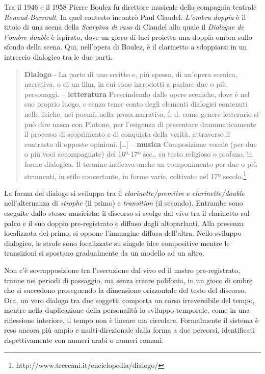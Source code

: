 Tra il 1946 e il 1958 Pierre Boulez fu direttore musicale della compagnia teatrale \emph{Renaud-Barrault}. In quel contesto incontrò Paul Claudel. \emph{L’ombra doppia} è il titolo di una scena della \emph{Scarpina di raso} di Claudel alla quale il \emph{Dialogue de l'ombre double} è ispirato, dove un gioco di luci proietta una doppia ombra sullo sfondo della scena. Qui, nell'opera di Boulez, è il clarinetto a sdoppiarsi in un intreccio dialogico tra le due parti.

\begin{quote}
{\small
\textbf{Dialogo} - La parte di uno scritto e, più spesso, di un’opera scenica, narrativa, o di un film, in cui sono introdotti a parlare due o più personaggi. -- \textbf{letteratura} Prescindendo dalle opere sceniche, dove è nel suo proprio luogo, e senza tener conto degli elementi dialogici contenuti nelle liriche, nei poemi, nella prosa narrativa, il d. come genere letterario si può dire nasca con Platone, per l’esigenza di presentare drammaticamente il processo di scoprimento e di conquista della verità, attraverso il contrasto di opposte opinioni. [\ldots] -- \textbf{musica} Composizione vocale (per due o più voci accompagnate) del 16º-17º sec., su testo religioso o profano, in forme dialogica. Il termine indicava anche un componimento per due o più strumenti, in stile concertante, in forme varie, coltivato nel 17º secolo.\footnote{http://www.treccani.it/enciclopedia/dialogo/}}
\end{quote}

La forma del dialogo si sviluppa tra il \emph{clarinette/première} e \emph{clarinette/double} nell'alternanza di \emph{strophe} (il primo) e \emph{transition} (il secondo). Entrambe sono eseguite dallo stesso musicista: il discorso si svolge dal vivo tra il clarinetto sul palco e il suo doppio pre-registrato e diffuso dagli altoparlanti. Alla presenza localizzata del primo, si oppone l'immagine diffusa dell'altra. Nello sviluppo dialogico, le strofe sono focalizzate su singole idee compositive mentre le transizioni si spostano gradualmente da un modello ad un altro.

Non c'è sovrapposizione tra l'esecuzione dal vivo ed il nastro pre-registrato, tranne nei periodi di passaggio, ma  senza creare polifonia, in un gioco di ombre che si succedono proseguendo la dimensione orizzontale del testo del discorso. Ora, un vero dialogo tra due soggetti comporta un corso irreversibile del tempo, mentre nella duplicazione della personalità lo sviluppo temporale, come in una riflessione interiore, il tempo non è lineare ma circolare. Formalmente il sistema è reso ancora più ampio e multi-direzionale dalla forma a due percorsi, identificati rispettivamente con numeri arabi o numeri romani.

